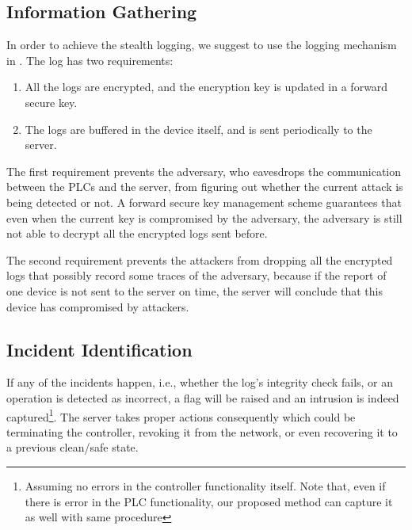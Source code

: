 \subsection{Information Gathering}

In order to achieve the stealth logging, we suggest to use the logging mechanism in \cite{IEEEhowto:kopka}. The log has two requirements:

\begin{enumerate}
\item All the logs are encrypted, and the encryption key is updated in a forward secure key. 
\item The logs are buffered in the device itself, and is sent periodically to the server.
\end{enumerate}

The first requirement prevents the adversary, who eavesdrops the communication between the PLCs and the server, from figuring out whether the current attack is being detected or not. A forward secure key management scheme guarantees that even when the current key is compromised by the adversary, the adversary is still not able to decrypt all the encrypted logs sent before. 

The second requirement prevents the attackers from dropping all the encrypted logs that possibly record some traces of the adversary, because if the report of one device is not sent to the server on time, the server will conclude that this device has compromised by attackers.

\subsection{Incident Identification}

If any of the incidents happen, i.e., whether the log's integrity check fails, or an operation is detected as incorrect, a flag will be raised and an intrusion is indeed captured\footnote{Assuming no errors in the controller functionality itself. Note that, even if there is error in the PLC functionality, our proposed method can capture it as well with same procedure}. The server takes proper actions consequently which could be terminating the controller, revoking it from the network, or even recovering it to a previous clean/safe state.

%


